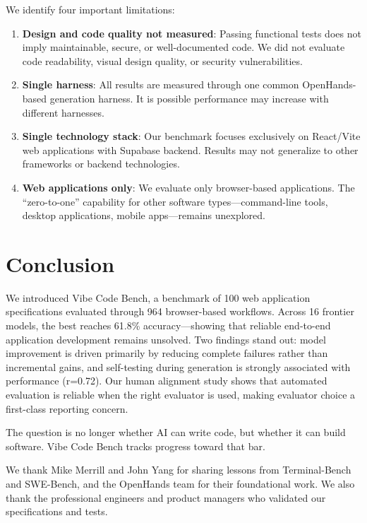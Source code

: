 We identify four important limitations:
\begin{enumerate}
    \item \textbf{Design and code quality not measured}: Passing functional tests does not imply maintainable, secure, or well-documented code. We did not evaluate code readability, visual design quality, or security vulnerabilities.
    \item \textbf{Single harness}: All results are measured through one common OpenHands-based generation harness. It is possible performance may increase with different harnesses.
    \item \textbf{Single technology stack}: Our benchmark focuses exclusively on React/Vite web applications with Supabase backend. Results may not generalize to other frameworks or backend technologies.
    \item \textbf{Web applications only}: We evaluate only browser-based applications. The ``zero-to-one'' capability for other software types---command-line tools, desktop applications, mobile apps---remains unexplored.
\end{enumerate}
\section{Conclusion}

We introduced Vibe Code Bench, a benchmark of 100 web application specifications evaluated through 964 browser-based workflows. Across 16 frontier models, the best reaches 61.8\% accuracy—showing that reliable end-to-end application development remains unsolved. Two findings stand out: model improvement is driven primarily by reducing complete failures rather than incremental gains, and self-testing during generation is strongly associated with performance (r=0.72). Our human alignment study shows that automated evaluation is reliable when the right evaluator is used, making evaluator choice a first-class reporting concern.

The question is no longer whether AI can write code, but whether it can build software. Vibe Code Bench tracks progress toward that bar.

\ifcameraready
\begin{acks}
We thank Mike Merrill and John Yang for sharing lessons from Terminal-Bench and SWE-Bench, and the OpenHands team for their foundational work. We also thank the professional engineers and product managers who validated our specifications and tests.
\end{acks}
\fi

